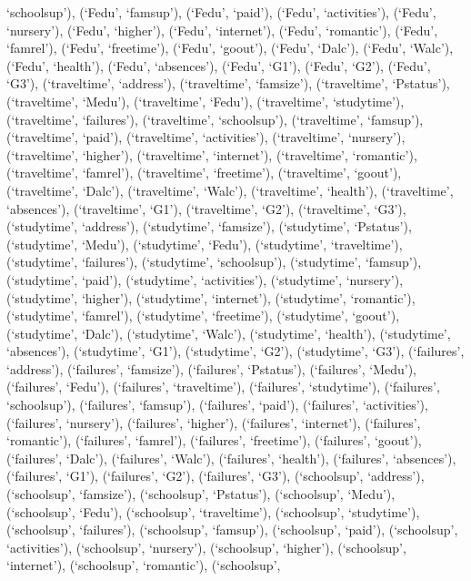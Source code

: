 \documentclass[
]{article}
\begin{document}
`schoolsup'), (`Fedu', `famsup'), (`Fedu', `paid'), (`Fedu',
`activities'), (`Fedu', `nursery'), (`Fedu', `higher'), (`Fedu',
`internet'), (`Fedu', `romantic'), (`Fedu', `famrel'), (`Fedu',
`freetime'), (`Fedu', `goout'), (`Fedu', `Dalc'), (`Fedu', `Walc'),
(`Fedu', `health'), (`Fedu', `absences'), (`Fedu', `G1'), (`Fedu',
`G2'), (`Fedu', `G3'), (`traveltime', `address'), (`traveltime',
`famsize'), (`traveltime', `Pstatus'), (`traveltime', `Medu'),
(`traveltime', `Fedu'), (`traveltime', `studytime'), (`traveltime',
`failures'), (`traveltime', `schoolsup'), (`traveltime', `famsup'),
(`traveltime', `paid'), (`traveltime', `activities'), (`traveltime',
`nursery'), (`traveltime', `higher'), (`traveltime', `internet'),
(`traveltime', `romantic'), (`traveltime', `famrel'), (`traveltime',
`freetime'), (`traveltime', `goout'), (`traveltime', `Dalc'),
(`traveltime', `Walc'), (`traveltime', `health'), (`traveltime',
`absences'), (`traveltime', `G1'), (`traveltime', `G2'), (`traveltime',
`G3'), (`studytime', `address'), (`studytime', `famsize'), (`studytime',
`Pstatus'), (`studytime', `Medu'), (`studytime', `Fedu'), (`studytime',
`traveltime'), (`studytime', `failures'), (`studytime', `schoolsup'),
(`studytime', `famsup'), (`studytime', `paid'), (`studytime',
`activities'), (`studytime', `nursery'), (`studytime', `higher'),
(`studytime', `internet'), (`studytime', `romantic'), (`studytime',
`famrel'), (`studytime', `freetime'), (`studytime', `goout'),
(`studytime', `Dalc'), (`studytime', `Walc'), (`studytime', `health'),
(`studytime', `absences'), (`studytime', `G1'), (`studytime', `G2'),
(`studytime', `G3'), (`failures', `address'), (`failures', `famsize'),
(`failures', `Pstatus'), (`failures', `Medu'), (`failures', `Fedu'),
(`failures', `traveltime'), (`failures', `studytime'), (`failures',
`schoolsup'), (`failures', `famsup'), (`failures', `paid'), (`failures',
`activities'), (`failures', `nursery'), (`failures', `higher'),
(`failures', `internet'), (`failures', `romantic'), (`failures',
`famrel'), (`failures', `freetime'), (`failures', `goout'), (`failures',
`Dalc'), (`failures', `Walc'), (`failures', `health'), (`failures',
`absences'), (`failures', `G1'), (`failures', `G2'), (`failures', `G3'),
(`schoolsup', `address'), (`schoolsup', `famsize'), (`schoolsup',
`Pstatus'), (`schoolsup', `Medu'), (`schoolsup', `Fedu'), (`schoolsup',
`traveltime'), (`schoolsup', `studytime'), (`schoolsup', `failures'),
(`schoolsup', `famsup'), (`schoolsup', `paid'), (`schoolsup',
`activities'), (`schoolsup', `nursery'), (`schoolsup', `higher'),
(`schoolsup', `internet'), (`schoolsup', `romantic'), (`schoolsup',
\end{document}
